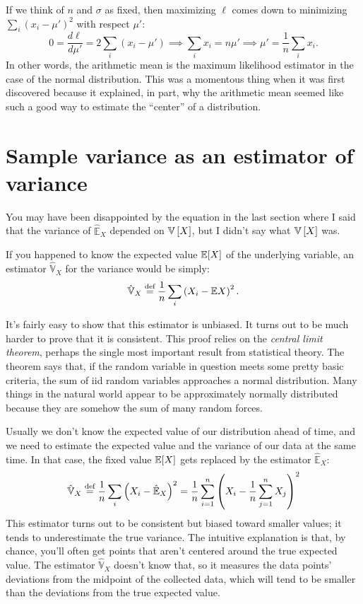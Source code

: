 If we think of $n$ and $\sigma$ as fixed, then maximizing $\ell$ comes down to
minimizing $\sum_i (x_i - \mu')^2$ with respect $\mu'$:
\begin{equation}
  0 = \frac{d \ell}{d \mu'} = 2 \sum_i (x_i - \mu') \implies \sum_i x_i = n \mu' \implies \mu' = \frac{1}{n} \sum_i x_i.
\end{equation}
In other words, the arithmetic mean is the maximum likelihood estimator in the
case of the normal distribution. This was a momentous thing when it was first
discovered because it explained, in part, why the arithmetic mean seemed like
such a good way to estimate the ``center'' of a distribution.

\section{Sample variance as an estimator of variance}

You may have been disappointed by the equation in the last section where I
said that the variance of $\hat{\mathbb{E}}_X$ depended on $\mathbb{V}\left[{X}\right]$, but I
didn't say what $\mathbb{V}\left[{X}\right]$ was.

If you happened to know the expected value $\mathbb{E}\!\left[{X}\right]$ of the underlying
variable, an estimator $\hat{\mathbb{V}}_X$ for the variance would be simply:
\begin{equation}
  \hat{\mathbb{V}}_X \stackrel{\text{def}}{=} \frac{1}{n} \sum_i \left( X_i - \mathbb{E}X \right)^2.
\end{equation}

It's fairly easy to show that this estimator is unbiased. It turns out to be
much harder to prove that it is consistent. This proof relies on the
\emph{central limit theorem}, perhaps the single most important result from
statistical theory. The theorem says that, if the random variable in question
meets some pretty basic criteria, the sum of iid random variables approaches a
normal distribution. Many things in the natural world appear to be
approximately normally distributed because they are somehow the sum of many
random forces.

Usually we don't know the expected value of our distribution ahead of time,
and we need to estimate the expected value and the variance of our data at the
same time. In that case, the fixed value $\mathbb{E}\!\left[{X}\right]$ gets replaced by the
estimator $\hat{\mathbb{E}}_X$:
\begin{equation}
\hat{\mathbb{V}}_X \stackrel{\text{def}}{=} \frac{1}{n} \sum_i \left( X_i - \hat{\mathbb{E}}_X \right)^2
  = \frac{1}{n} \sum_{i=1}^n \left( X_i - \frac{1}{n} \sum_{j=1}^n X_j \right)^2
\end{equation}
This estimator turns out to be consistent but biased toward smaller values; it
tends to underestimate the true variance. The intuitive explanation is that,
by chance, you'll often get points that aren't centered around the true
expected value. The estimator $\hat{\mathbb{V}}_X$ doesn't know that, so it
measures the data points' deviations from the midpoint of the collected data,
which will tend to be smaller than the deviations from the true expected
value.

